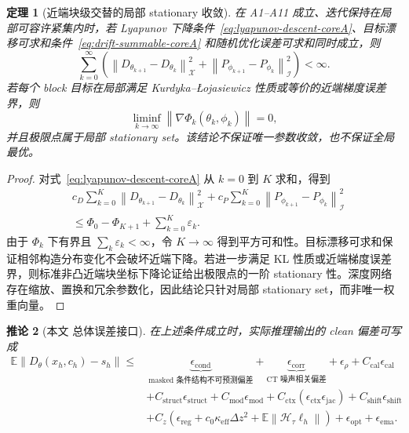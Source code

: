 \documentclass[11pt,a4paper,UTF8,fontset=fandol]{ctexart}
\newtheorem{theorem}{定理}[section]
\newtheorem{corollary}[theorem]{推论}
\theoremstyle{definition}
\newcommand{\norm}[1]{\left\lVert#1\right\rVert}
\newcommand{\E}{\mathbb{E}}
\newcommand{\cH}{\mathcal{H}}
\begin{document}
\begin{theorem}[近端块级交替的局部 stationary 收敛]
\label{thm:stationary-coreA}
在 A1--A11 成立、迭代保持在局部可容许紧集内时，若 Lyapunov 下降条件~\eqref{eq:lyapunov-descent-coreA}、目标漂移可求和条件~\eqref{eq:drift-summable-coreA} 和随机优化误差可求和同时成立，则
\begin{equation}
\label{eq:square-summable-coreA}
    \sum_{k=0}^\infty
    \left(
    \norm{D_{\theta_{k+1}}-D_{\theta_k}}_{\mathcal X}^2
    +\norm{P_{\phi_{k+1}}-P_{\phi_k}}_{\mathcal I}^2
    \right)<\infty.
\end{equation}
若每个 block 目标在局部满足 Kurdyka--\L{}ojasiewicz 性质或等价的近端梯度误差界，则
\begin{equation}
\label{eq:stationary-coreA}
    \liminf_{k\to\infty}\norm{\nabla \Phi_k(\theta_k,\phi_k)}=0,
\end{equation}
并且极限点属于局部 stationary set。该结论不保证唯一参数收敛，也不保证全局最优。
\end{theorem}

\begin{proof}
对式~\eqref{eq:lyapunov-descent-coreA} 从 $k=0$ 到 $K$ 求和，得到
\begin{equation}
\begin{aligned}
&c_D\sum_{k=0}^K\norm{D_{\theta_{k+1}}-D_{\theta_k}}_{\mathcal X}^2
+c_P\sum_{k=0}^K\norm{P_{\phi_{k+1}}-P_{\phi_k}}_{\mathcal I}^2\\
&\le \Phi_0-\Phi_{K+1}+\sum_{k=0}^K\varepsilon_k.
\end{aligned}
\end{equation}
由于 $\Phi_k$ 下有界且 $\sum_k\varepsilon_k<\infty$，令 $K\to\infty$ 得到平方可和性。目标漂移可求和保证相邻构造分布变化不会破坏近端下降。若进一步满足 KL 性质或近端梯度误差界，则标准非凸近端块坐标下降论证给出极限点的一阶 stationary 性。深度网络存在缩放、置换和冗余参数化，因此结论只针对局部 stationary set，而非唯一权重向量。
\end{proof}

\begin{corollary}[本文 总体误差接口]
\label{cor:overall-coreA}
在上述条件成立时，实际推理输出的 clean 偏差可写成
\begin{equation}
\label{eq:overall-error-coreA}
\begin{aligned}
    \E\norm{D_{\theta}(x_h,c_h)-s_h}
    \le&\
    \underbrace{\epsilon_{\mathrm{cond}}}_{\text{masked 条件结构不可预测偏差}}
    +\underbrace{\epsilon_{\mathrm{corr}}}_{\text{CT 噪声相关偏差}}
    +\epsilon_\rho
    +C_{\mathrm{cal}}\epsilon_{\mathrm{cal}}\\
    &+C_{\mathrm{struct}}\epsilon_{\mathrm{struct}}
    +C_{\mathrm{mod}}\epsilon_{\mathrm{mod}}
    +C_{\mathrm{ctx}}(\epsilon_{\mathrm{ctx}}\epsilon_{\mathrm{jac}})
    +C_{\mathrm{shift}}\epsilon_{\mathrm{shift}}\\
    &+C_z\left(\epsilon_{\mathrm{reg}}+c_0\kappa_{\mathrm{eff}}\Delta z^2+\E\norm{\cH_\tau\ell_h}\right)
    +\epsilon_{\mathrm{opt}}+\epsilon_{\mathrm{ema}}.
\end{aligned}
\end{equation}
\end{corollary}
\end{document}
